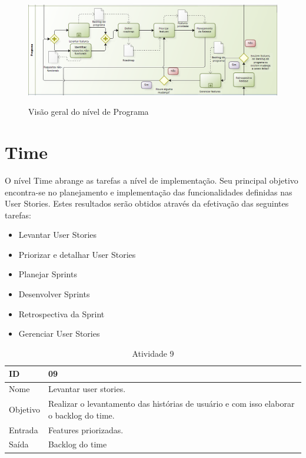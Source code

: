 \FloatBarrier
\begin{figure}[!htpd]
		\centering
		\includegraphics[scale=0.5]{figuras/Programa}
		\label{img:programa}
		\caption{Visão geral do nível de Programa}
\end{figure}
\FloatBarrier



\section{Time}

O nível Time abrange as tarefas a nível de implementação. Seu principal objetivo encontra-se no planejamento e implementação das funcionalidades definidas nas User Stories.  Estes resultados serão obtidos através da efetivação das seguintes tarefas:

\begin{itemize}
\item Levantar User Stories
\item Priorizar e detalhar User Stories
\item Planejar Sprints
\item Desenvolver Sprints
\item Retrospectiva da Sprint
\item Gerenciar User Stories
\end{itemize}

\begin{table}[\htp]
\centering
\caption{Atividade 9}
\label{my-label}
\begin{tabular}{|l|l|}
\hline
ID       & 09                                             \\ \hline
Nome     & Levantar user stories. \\ \hline
Objetivo & Realizar o levantamento das histórias de usuário e com isso elaborar o backlog do time.
 \\ \hline
Entrada  &  Features priorizadas. \\ \hline
Saída    &  Backlog do time \\ \hline
\end{tabular}
\end{table}

